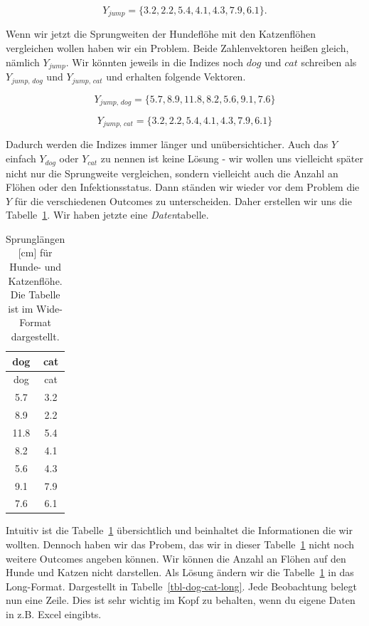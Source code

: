 \documentclass[
  letterpaper,
]{scrbook}
\begin{document}
\[
Y_{jump} = \{3.2, 2.2, 5.4, 4.1, 4.3, 7.9, 6.1\}.
\]

Wenn wir jetzt die Sprungweiten der Hundeflöhe mit den Katzenflöhen
vergleichen wollen haben wir ein Problem. Beide Zahlenvektoren heißen
gleich, nämlich \(Y_{jump}\). Wir könnten jeweils in die Indizes noch
\(dog\) und \(cat\) schreiben als \(Y_{jump,\, dog}\) und
\(Y_{jump,\, cat}\) und erhalten folgende Vektoren.

\[
Y_{jump,\, dog} = \{5.7, 8.9, 11.8, 8.2, 5.6, 9.1, 7.6\}
\]

\[
Y_{jump,\, cat} = \{3.2, 2.2, 5.4, 4.1, 4.3, 7.9, 6.1\}
\]

Dadurch werden die Indizes immer länger und unübersichticher. Auch das
\(Y\) einfach \(Y_{dog}\) oder \(Y_{cat}\) zu nennen ist keine Lösung -
wir wollen uns vielleicht später nicht nur die Sprungweite vergleichen,
sondern vielleicht auch die Anzahl an Flöhen oder den Infektionsstatus.
Dann ständen wir wieder vor dem Problem die \(Y\) für die verschiedenen
Outcomes zu unterscheiden. Daher erstellen wir uns die
Tabelle~\ref{tbl-dog-cat-wide}. Wir haben jetzte eine
\emph{Daten}tabelle.

\hypertarget{tbl-dog-cat-wide}{}
\begin{longtable}[]{@{}cc@{}}
\caption{\label{tbl-dog-cat-wide}Sprunglängen {[}cm{]} für Hunde- und
Katzenflöhe. Die Tabelle ist im Wide-Format dargestellt.}\tabularnewline
\toprule()
dog & cat \\
\midrule()
\endfirsthead
\toprule()
dog & cat \\
\midrule()
\endhead
5.7 & 3.2 \\
8.9 & 2.2 \\
11.8 & 5.4 \\
8.2 & 4.1 \\
5.6 & 4.3 \\
9.1 & 7.9 \\
7.6 & 6.1 \\
\bottomrule()
\end{longtable}

Intuitiv ist die Tabelle~\ref{tbl-dog-cat-wide} übersichtlich und
beinhaltet die Informationen die wir wollten. Dennoch haben wir das
Probem, das wir in dieser Tabelle~\ref{tbl-dog-cat-wide} nicht noch
weitere Outcomes angeben können. Wir können die Anzahl an Flöhen auf den
Hunde und Katzen nicht darstellen. Als Lösung ändern wir die
Tabelle~\ref{tbl-dog-cat-wide} in das Long-Format. Dargestellt in
Tabelle~\ref{tbl-dog-cat-long}. Jede Beobachtung belegt nun eine Zeile.
Dies ist sehr wichtig im Kopf zu behalten, wenn du eigene Daten in z.B.
Excel eingibts.
\end{document}
